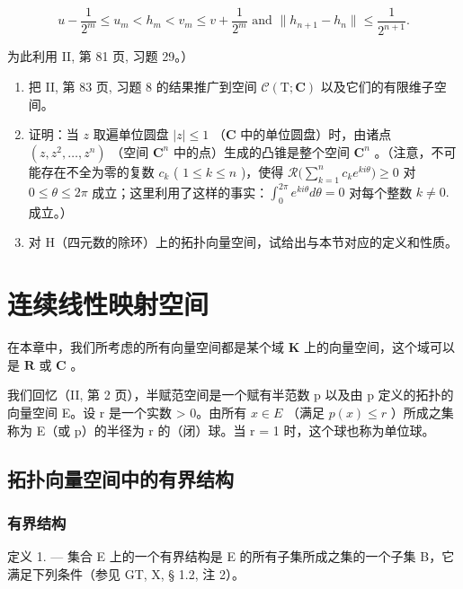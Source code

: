 \[
u - \frac {1}{2 ^ {m}} \leqslant u _ {m} <   h _ {m} <   v _ {m} \leqslant v + \frac {1}{2 ^ {m}} \text { and } \| h _ {n + 1} - h _ {n} \| \leqslant \frac {1}{2 ^ {n + 1}}.
\]

为此利用 II, 第 81 页, 习题 29。）

\exercisegroup

\begin{enumerate}
\def\labelenumi{\arabic{enumi})}
\item
  把 II, 第 83 页, 习题 8 的结果推广到空间 \(\mathcal{C}(\mathrm{T};\mathbf{C})\) 以及它们的有限维子空间。
\item
  证明：当 \(z\) 取遍单位圆盘 \(|z| \leqslant 1\) （\(\mathbf{C}\) 中的单位圆盘）时，由诸点 \((z, z^2, \dots, z^n)\) （空间 \(\mathbf{C}^n\) 中的点）生成的凸锥是整个空间 \(\mathbf{C}^n\) 。（注意，不可能存在不全为零的复数 \(c_k\) ( \(1 \leqslant k \leqslant n\) )，使得 \(\mathcal{R}\big(\sum_{k=1}^{n} c_k e^{ki\theta}\big) \geqslant 0\) 对 \(0 \leqslant \theta \leqslant 2\pi\) 成立；这里利用了这样的事实：\(\int_0^{2\pi}e^{ki\theta}d\theta = 0\) 对每个整数 \(k\neq 0.\) 成立。）
\item
  对 H（四元数的除环）上的拓扑向量空间，试给出与本节对应的定义和性质。
\end{enumerate}

\chapter{连续线性映射空间}

在本章中，我们所考虑的所有向量空间都是某个域 \(\mathbf{K}\) 上的向量空间，这个域可以是 \(\mathbf{R}\) 或 \(\mathbf{C}\) 。

我们回忆（II, 第 2 页），半赋范空间是一个赋有半范数 p 以及由 p 定义的拓扑的向量空间 E。设 r 是一个实数 \textgreater{} 0。由所有 \(x \in E\) （满足 \(p(x) \leqslant r\) ）所成之集称为 E（或 p）的半径为 r 的（闭）球。当 r = 1 时，这个球也称为单位球。

\section{拓扑向量空间中的有界结构}

\subsection{有界结构}

定义 1. --- 集合 E 上的一个有界结构是 E 的所有子集所成之集的一个子集 B，它满足下列条件（参见 GT, X, § 1.2, 注 2）。

